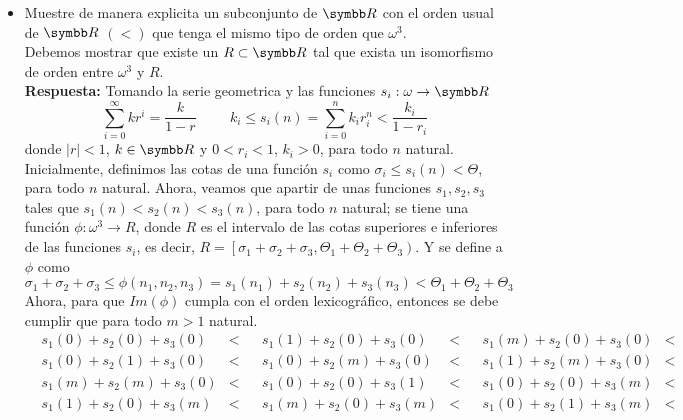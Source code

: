\documentclass{article}
\begin{document}
\maketitle

\begin{itemize} 
    \item Muestre de manera explicita un subconjunto de \(\realR{}\) con el orden usual de \(\realR{}\) \(\left(<\right)\) que tenga el mismo tipo de orden que \(\omega^{3}\). \\
        Debemos mostrar que existe un \(R \subset \realR\) tal que exista un isomorfismo de orden entre \(\omega^3\) y \(R\). 
        \\
        \textbf{Respuesta: } 
        Tomando la serie geometrica y las funciones \(s_i: \omega \rightarrow \realR\)
        \[
            \sum_{i=0}^{\infty} kr^i = \frac{k}{1-r} 
            \hspace{1cm}
            k_{i} \leq s_i(n) = \sum_{i=0}^{n} k_{i}r_i^n < \frac{k_{i}}{1-r_i}
        \] 
        donde \(\left|r\right| < 1\), \(k \in \realR\) y \(0 < r_i < 1\), \(k_i > 0\), para todo \(n\) natural. Inicialmente, definimos las cotas de una función \(s_i\) como 
        \(\sigma_i \leq s_i(n) < \Theta\), para todo \(n\) natural.
        Ahora, veamos que apartir de unas funciones \(s_1, s_2, s_3\) tales que \(s_1(n) < s_2(n) < s_3(n)\), para todo \(n\) natural;
        se tiene una función \(\phi: \omega^3 \rightarrow R\), donde \(R\) es el intervalo de las cotas superiores e inferiores de las funciones \(s_i\), 
        es decir, \(R = \left[\sigma_1 + \sigma_2 + \sigma_3, \Theta_1 + \Theta_2 + \Theta_3\right)\). Y se define a \(\phi\) como
        \[
            \sigma_1 + \sigma_2 + \sigma_3 \leq \phi(n_1, n_2, n_3) = s_1(n_1) + s_2(n_2) + s_3(n_3) < \Theta_1 + \Theta_2 + \Theta_3
        \]
        Ahora, para que \(Im(\phi)\) cumpla con el orden lexicográfico, entonces se debe cumplir que para todo \(m > 1\) natural.
        \[
            \begin{aligned}
                &s_1(0) + s_2(0) + s_3(0)& <& &s_1(1) + s_2(0) + s_3(0)& <& &s_1(m) + s_2(0) + s_3(0)& <\\
                &s_1(0) + s_2(1) + s_3(0)& <& &s_1(0) + s_2(m) + s_3(0)& <& &s_1(1) + s_2(m) + s_3(0)& <\\
                &s_1(m) + s_2(m) + s_3(0)& <& &s_1(0) + s_2(0) + s_3(1)& <& &s_1(0) + s_2(0) + s_3(m)& <\\
                &s_1(1) + s_2(0) + s_3(m)& <& &s_1(m) + s_2(0) + s_3(m)& <& &s_1(0) + s_2(1) + s_3(m)& <\\

\end{aligned}\]
\end{itemize}
\end{document}
